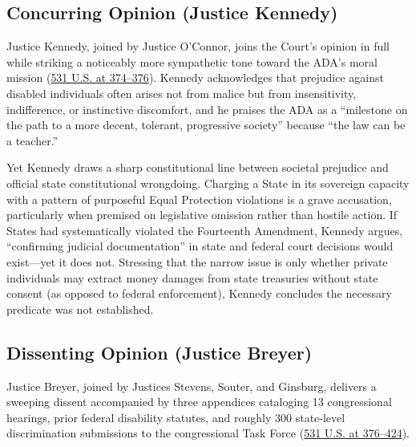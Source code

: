 \documentclass[12pt]{article}
\begin{document}
\subsection{Concurring Opinion (Justice Kennedy)}

Justice Kennedy, joined by Justice O'Connor, joins the Court's opinion in full while striking a noticeably more sympathetic tone toward the ADA's moral mission (\href{https://supreme.justia.com/cases/federal/us/531/356/}{531 U.S. at 374--376}). Kennedy acknowledges that prejudice against disabled individuals often arises not from malice but from insensitivity, indifference, or instinctive discomfort, and he praises the ADA as a ``milestone on the path to a more decent, tolerant, progressive society'' because ``the law can be a teacher.''

Yet Kennedy draws a sharp constitutional line between societal prejudice and official state constitutional wrongdoing. Charging a State in its sovereign capacity with a pattern of purposeful Equal Protection violations is a grave accusation, particularly when premised on legislative omission rather than hostile action. If States had systematically violated the Fourteenth Amendment, Kennedy argues, ``confirming judicial documentation'' in state and federal court decisions would exist---yet it does not. Stressing that the narrow issue is only whether private individuals may extract money damages from state treasuries without state consent (as opposed to federal enforcement), Kennedy concludes the necessary predicate was not established.

\subsection{Dissenting Opinion (Justice Breyer)}

Justice Breyer, joined by Justices Stevens, Souter, and Ginsburg, delivers a sweeping dissent accompanied by three appendices cataloging 13 congressional hearings, prior federal disability statutes, and roughly 300 state-level discrimination submissions to the congressional Task Force (\href{https://supreme.justia.com/cases/federal/us/531/356/}{531 U.S. at 376--424}).
\end{document}
